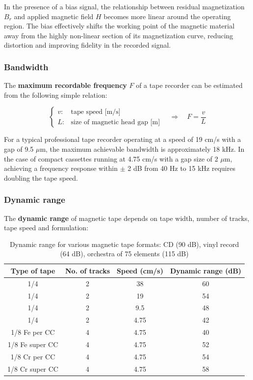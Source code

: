 In the presence of a bias signal, the relationship between residual magnetization $B_r$ and applied magnetic field $H$ becomes more linear around the operating region. 
The bias effectively shifts the working point of the magnetic material away from the highly non-linear section of its magnetization curve, reducing distortion and improving fidelity in the recorded signal.

\subsubsection{Bandwidth}
The \textbf{maximum recordable frequency} $F$ of a tape recorder can be estimated from the following simple relation:

\[
\begin{cases}
v: & \text{tape speed [m/s]} \\
L: & \text{size of magnetic head gap [m]}
\end{cases}
\quad \Rightarrow \quad
F = \frac{v}{L}
\]

For a typical professional tape recorder operating at a speed of 19 cm/s with a gap of 9.5 $\mu$m, the maximum achievable bandwidth is approximately 18 kHz.  
In the case of compact cassettes running at 4.75 cm/s with a gap size of 2 $\mu$m, achieving a frequency response within $\pm$ 2 dB from 40 Hz to 15 kHz requires doubling the tape speed.

\subsubsection{Dynamic range}
The \textbf{dynamic range} of magnetic tape depends on tape width, number of tracks, tape speed and formulation:

\begin{table}[H]
\centering
\begin{tabular}{cccc}
\toprule
\textbf{Type of tape} & \textbf{No. of tracks} & \textbf{Speed (cm/s)} & \textbf{Dynamic range (dB)} \\
\midrule
1/4 & 2 & 38   & 60 \\
1/4 & 2 & 19   & 54 \\
1/4 & 2 & 9.5  & 48 \\
1/4 & 2 & 4.75 & 42 \\
1/8 Fe per CC & 4 & 4.75 & 40 \\
1/8 Fe super CC & 4 & 4.75 & 52 \\
1/8 Cr per CC & 4 & 4.75 & 54 \\
1/8 Cr super CC & 4 & 4.75 & 58 \\
\bottomrule
\end{tabular}
\caption{Dynamic range for various magnetic tape formats: CD (90 dB), vinyl record (64 dB), orchestra of 75 elements (115 dB)}
\end{table}

